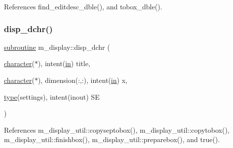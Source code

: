 References find\+\_\+editdesc\+\_\+dble(), and tobox\+\_\+dble().

\mbox{\label{namespacem__display_a41b95f416778be093db3be49b2334570}} 
\subsubsection{\texorpdfstring{disp\+\_\+dchr()}{disp\_dchr()}}
{\footnotesize\ttfamily \hyperlink{M__stopwatch_83_8txt_acfbcff50169d691ff02d4a123ed70482}{subroutine} m\+\_\+display\+::disp\+\_\+dchr (\begin{DoxyParamCaption}\item[{\hyperlink{option__stopwatch_83_8txt_abd4b21fbbd175834027b5224bfe97e66}{character}($\ast$), intent(\hyperlink{M__journal_83_8txt_afce72651d1eed785a2132bee863b2f38}{in})}]{title,  }\item[{\hyperlink{option__stopwatch_83_8txt_abd4b21fbbd175834027b5224bfe97e66}{character}($\ast$), dimension(\+:,\+:), intent(\hyperlink{M__journal_83_8txt_afce72651d1eed785a2132bee863b2f38}{in})}]{x,  }\item[{\hyperlink{stop__watch_83_8txt_a70f0ead91c32e25323c03265aa302c1c}{type}(settings), intent(inout)}]{SE }\end{DoxyParamCaption})\hspace{0.3cm}{\ttfamily [private]}}



References m\+\_\+display\+\_\+util\+::copyseptobox(), m\+\_\+display\+\_\+util\+::copytobox(), m\+\_\+display\+\_\+util\+::finishbox(), m\+\_\+display\+\_\+util\+::preparebox(), and true().

\mbox{\label{namespacem__display_a0e150cc23de78529e22b17b1873a9e6e}} 
